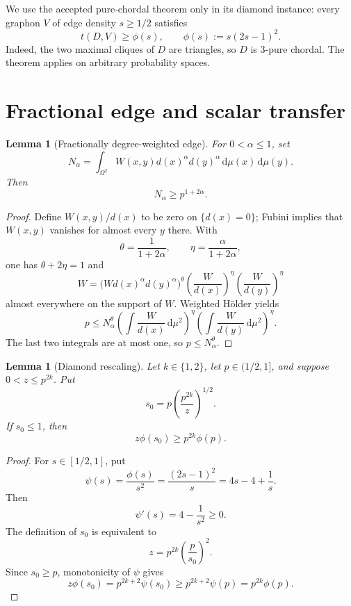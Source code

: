 \documentclass[11pt]{article}
\newtheorem{lemma}[theorem]{Lemma}
\newcommand{\dd}{\,\mathrm d}
\begin{document}
We use the accepted pure-chordal theorem only in its diamond instance:
every graphon $V$ of edge density $s\geq1/2$ satisfies
\begin{equation}
 t(D,V)\geq\phi(s),
 \qquad
 \phi(s):=s(2s-1)^2.
 \label{eq:diamond-input}
\end{equation}
Indeed, the two maximal cliques of $D$ are triangles, so $D$ is
$3$-pure chordal.  The theorem applies on arbitrary probability spaces.


\section{Fractional edge and scalar transfer}

\begin{lemma}[Fractionally degree-weighted edge]
\label{lem:fractional-edge}
For $0<\alpha\leq1$, set
\[
 N_\alpha=\int_{\Omega^2}W(x,y)d(x)^\alpha d(y)^\alpha
 \dd\mu(x)\dd\mu(y).
\]
Then
\[
 N_\alpha\geq p^{1+2\alpha}.
\]
\end{lemma}

\begin{proof}
Define $W(x,y)/d(x)$ to be zero on $\{d(x)=0\}$; Fubini implies that
$W(x,y)$ vanishes for almost every $y$ there.  With
\[
 \theta=\frac1{1+2\alpha},
 \qquad
 \eta=\frac\alpha{1+2\alpha},
\]
one has $\theta+2\eta=1$ and
\[
 W
 =\bigl(Wd(x)^\alpha d(y)^\alpha\bigr)^\theta
  \left(\frac W{d(x)}\right)^\eta
  \left(\frac W{d(y)}\right)^\eta
\]
almost everywhere on the support of $W$.  Weighted H\"older yields
\[
 p\leq N_\alpha^\theta
 \left(\int\frac W{d(x)}\dd\mu^2\right)^\eta
 \left(\int\frac W{d(y)}\dd\mu^2\right)^\eta.
\]
The last two integrals are at most one, so $p\leq N_\alpha^\theta$.
\end{proof}

\begin{lemma}[Diamond rescaling]
\label{lem:scalar}
Let $k\in\{1,2\}$, let $p\in(1/2,1]$, and suppose
$0<z\leq p^{2k}$.  Put
\[
 s_0=p\left(\frac{p^{2k}}z\right)^{1/2}.
\]
If $s_0\leq1$, then
\[
 z\phi(s_0)\geq p^{2k}\phi(p).
\]
\end{lemma}

\begin{proof}
For $s\in[1/2,1]$, put
\[
 \psi(s)=\frac{\phi(s)}{s^2}
 =\frac{(2s-1)^2}s=4s-4+\frac1s.
\]
Then
\[
 \psi'(s)=4-\frac1{s^2}\geq0.
\]
The definition of $s_0$ is equivalent to
\[
 z=p^{2k}\left(\frac p{s_0}\right)^2.
\]
Since $s_0\geq p$, monotonicity of $\psi$ gives
\[
 z\phi(s_0)
 =p^{2k+2}\psi(s_0)
 \geq p^{2k+2}\psi(p)
 =p^{2k}\phi(p).
\]
\end{proof}
\end{document}
